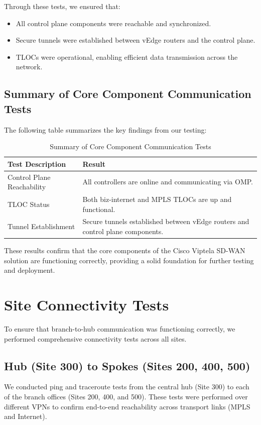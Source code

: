 \documentclass[12pt,english]{report}
\begin{document}
Through these tests, we ensured that:
\begin{itemize}
    \item All control plane components were reachable and synchronized.
    \item Secure tunnels were established between vEdge routers and the control plane.
    \item TLOCs were operational, enabling efficient data transmission across the network.
\end{itemize}

\subsection{Summary of Core Component Communication Tests}

The following table summarizes the key findings from our testing:

\begin{table}[h]
\centering
\footnotesize
\caption{Summary of Core Component Communication Tests}
\label{tab:core_component_tests}
\begin{tabularx}{\linewidth}{@{}>{\raggedright\arraybackslash}p{4.5cm}>{\raggedright\arraybackslash}X@{}}
\toprule
\textbf{Test Description} & \textbf{Result} \\
\midrule
Control Plane Reachability & All controllers are online and communicating via OMP. \\
\midrule
TLOC Status & Both biz-internet and MPLS TLOCs are up and functional. \\
\midrule
Tunnel Establishment & Secure tunnels established between vEdge routers and control plane components. \\
\bottomrule
\end{tabularx}
\end{table}
These results confirm that the core components of the Cisco Viptela SD-WAN solution are functioning correctly, providing a solid foundation for further testing and deployment.

\section{Site Connectivity Tests}
To ensure that branch-to-hub communication was functioning correctly, we performed comprehensive connectivity tests across all sites.

\subsection{Hub (Site 300) to Spokes (Sites 200, 400, 500)}
We conducted ping and traceroute tests from the central hub (Site 300) to each of the branch offices (Sites 200, 400, and 500). These tests were performed over different VPNs to confirm end-to-end reachability across transport links (MPLS and Internet).
\end{document}
